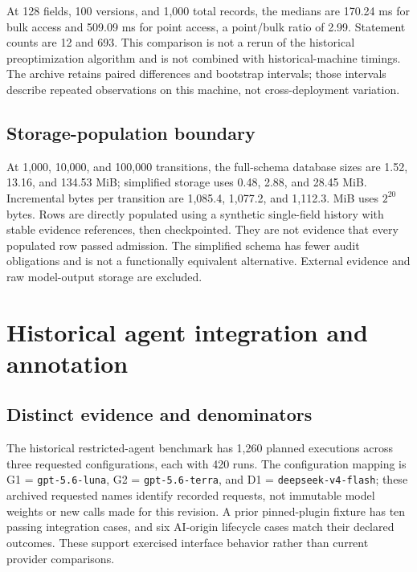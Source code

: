 \documentclass[preprint,12pt,authoryear]{elsarticle}
\newcommand{\code}[1]{\nolinkurl{#1}}
\begin{document}


At 128 fields, 100 versions, and 1,000 total records, the medians are 170.24 ms for bulk access and 509.09 ms for point access, a point/bulk ratio of 2.99. Statement counts are 12 and 693. This comparison is not a rerun of the historical preoptimization algorithm and is not combined with historical-machine timings. The archive retains paired differences and bootstrap intervals; those intervals describe repeated observations on this machine, not cross-deployment variation.

\subsection{Storage-population boundary}

At 1,000, 10,000, and 100,000 transitions, the full-schema database sizes are 1.52, 13.16, and 134.53 MiB; simplified storage uses 0.48, 2.88, and 28.45 MiB. Incremental bytes per transition are 1,085.4, 1,077.2, and 1,112.3. MiB uses $2^{20}$ bytes. Rows are directly populated using a synthetic single-field history with stable evidence references, then checkpointed. They are not evidence that every populated row passed admission. The simplified schema has fewer audit obligations and is not a functionally equivalent alternative. External evidence and raw model-output storage are excluded.

\section{Historical agent integration and annotation}
\label{app:historical-integration}

\subsection{Distinct evidence and denominators}

The historical restricted-agent benchmark has 1,260 planned executions across three requested configurations, each with 420 runs. The configuration mapping is G1 = \code{gpt-5.6-luna}, G2 = \code{gpt-5.6-terra}, and D1 = \code{deepseek-v4-flash}; these archived requested names identify recorded requests, not immutable model weights or new calls made for this revision. A prior pinned-plugin fixture has ten passing integration cases, and six AI-origin lifecycle cases match their declared outcomes. These support exercised interface behavior rather than current provider comparisons.
\end{document}
